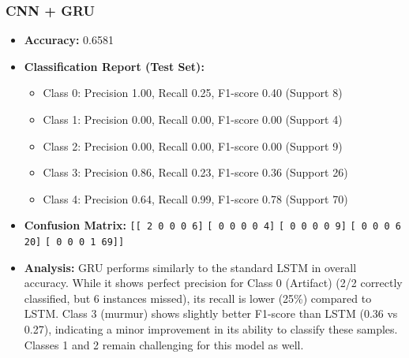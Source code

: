 \documentclass[a4paper]{article}
\begin{document}
\begin{multicols}{2}
\subsubsection{CNN + GRU}
\begin{itemize}
    \item \textbf{Accuracy:} 0.6581 
    \item \textbf{Classification Report (Test Set):} 
        \begin{itemize}
            \item Class 0: Precision 1.00, Recall 0.25, F1-score 0.40 (Support 8)
            \item Class 1: Precision 0.00, Recall 0.00, F1-score 0.00 (Support 4)
            \item Class 2: Precision 0.00, Recall 0.00, F1-score 0.00 (Support 9)
            \item Class 3: Precision 0.86, Recall 0.23, F1-score 0.36 (Support 26)
            \item Class 4: Precision 0.64, Recall 0.99, F1-score 0.78 (Support 70)
        \end{itemize}
    \item \textbf{Confusion Matrix:} 
        \texttt{[[ 2 0 0 0 6]}
        \texttt{[ 0 0 0 0 4]}
        \texttt{[ 0 0 0 0 9]}
        \texttt{[ 0 0 0 6 20]}
        \texttt{[ 0 0 0 1 69]]}
    \item \textbf{Analysis:} GRU performs similarly to the standard LSTM in overall accuracy. While it shows perfect precision for Class 0 (Artifact) (2/2 correctly classified, but 6 instances missed), its recall is lower (25\%) compared to LSTM. Class 3 (murmur) shows slightly better F1-score than LSTM (0.36 vs 0.27), indicating a minor improvement in its ability to classify these samples. Classes 1 and 2 remain challenging for this model as well.

\end{itemize}


\end{multicols}
\end{document}
